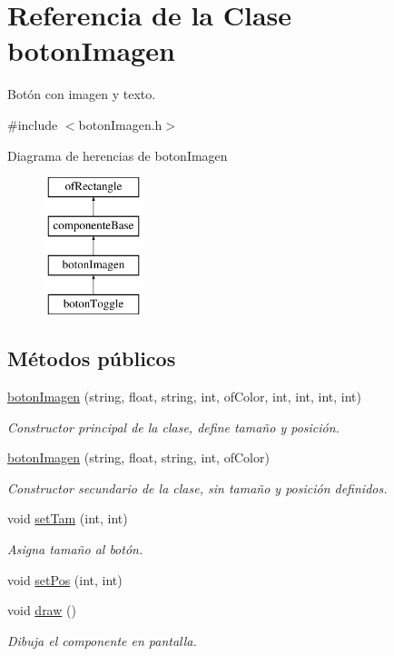 \hypertarget{classboton_imagen}{}\section{Referencia de la Clase boton\+Imagen}
\label{classboton_imagen}


Botón con imagen y texto.  




{\ttfamily \#include $<$boton\+Imagen.\+h$>$}

Diagrama de herencias de boton\+Imagen\begin{figure}[H]
\begin{center}
\leavevmode
\includegraphics[height=4.000000cm]{classboton_imagen}
\end{center}
\end{figure}
\subsection*{Métodos públicos}
\begin{DoxyCompactItemize}
\item 
\hyperlink{classboton_imagen_a39ee73ee8807ad4339d6a0a080bc8f6d}{boton\+Imagen} (string, float, string, int, of\+Color, int, int, int, int)
\begin{DoxyCompactList}\small\item\em Constructor principal de la clase, define tamaño y posición. \end{DoxyCompactList}\item 
\hyperlink{classboton_imagen_ad6917e2e059fa4a8247ada624663b19a}{boton\+Imagen} (string, float, string, int, of\+Color)
\begin{DoxyCompactList}\small\item\em Constructor secundario de la clase, sin tamaño y posición definidos. \end{DoxyCompactList}\item 
void \hyperlink{classboton_imagen_aca8f9275bf3f03f48d7e34803e0345bf}{set\+Tam} (int, int)
\begin{DoxyCompactList}\small\item\em Asigna tamaño al botón. \end{DoxyCompactList}\item 
void \hyperlink{classboton_imagen_a27a090f89bbf2489401f1e6c5286d3ec}{set\+Pos} (int, int)
\item 
void \hyperlink{classboton_imagen_aa2f66743b229d99cc06b36f5ad16450d}{draw} ()
\begin{DoxyCompactList}\small\item\em Dibuja el componente en pantalla. \end{DoxyCompactList}\end{DoxyCompactItemize}
